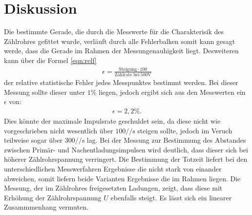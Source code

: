 \section{Diskussion}
\label{sec:Diskussion}
Die bestimmte Gerade, die durch die Messwerte für die Charakterisik
des Zählrohres gefittet wurde, verläuft durch alle Fehlerbalken somit
kann gesagt werde, dass die Gerade im Rahmen der Messungenauhigkeit liegt.
Desweiteren kann über die Formel \eqref{eqn:relf}
\begin{align}
 \epsilon=\frac{\mathrm{Steigung}\cdot100}{\mathrm{Zählrate \ bei} \ 500\si{\volt}} \label{eqn:relf}
\end{align}
der relative statistische Fehler jedes Messpunktes bestimmt werden.
Bei dieser Messung sollte dieser unter $1\%$  liegen, jedoch
ergibt sich aus den Messwerten
ein $\epsilon$ von:
\begin{align*}
\epsilon=2,2\%.
\end{align*}
Dies könnte der maximale Impulsrate geschuldet
sein, da diese nicht wie vorgeschrieben
nicht wesentlich über $100/\si{\per\second}$ steigen
sollte, jedoch im Veruch teilweise sogar über $300/\si{\per\second}$
lag.
Bei der Messung zur Bestimmung des Abstandes zwischen Primär- und Nachentladungsimpulsen
wird deutlich, dass dieser sich bei höherer Zählrohrspannung verringert.
Die Bestimmung der Totzeit liefert bei den unterschiedlichen
Messwerfahren Ergebnisse die nicht stark von einander abweichen, somit
liefern beide Varianten Ergebnisse die im Rahmen liegen.
Die Messung, der im Zählrohres freigesetzten Ladungen,
zeigt, dass diese mit Erhöhung der Zählrohrspannung $U$
ebenfalls steigt. Es lässt sich ein linearer Zusammmenhang
vermuten.
